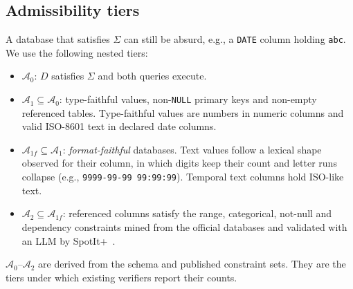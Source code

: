 \subsection{Admissibility tiers}
A database that satisfies $\Sigma$ can still be absurd, e.g., a \texttt{DATE} column holding \texttt{\textquotesingle{}abc\textquotesingle{}}. We use the following nested tiers:
\begin{itemize}
\item $\mathcal A_0$: $D$ satisfies $\Sigma$ and both queries execute.
\item $\mathcal A_1\subseteq\mathcal A_0$: type-faithful values, non-\texttt{NULL} primary keys and non-empty referenced tables. Type-faithful values are numbers in numeric columns and valid ISO-8601 text in declared date columns.
\item $\mathcal A_{1f}\subseteq\mathcal A_1$: \emph{format-faithful} databases. Text values follow a lexical shape observed for their column, in which digits keep their count and letter runs collapse (e.g., \texttt{9999-99-99 99:99:99}). Temporal text columns hold ISO-like text.
\item $\mathcal A_2\subseteq\mathcal A_{1f}$: referenced columns satisfy the range, categorical, not-null and dependency constraints mined from the official databases and validated with an LLM by SpotIt+~\cite{tremante2026spotitplus}.
\end{itemize}
$\mathcal A_0$--$\mathcal A_2$ are derived from the schema and published constraint sets. They are the tiers under which existing verifiers report their counts.

